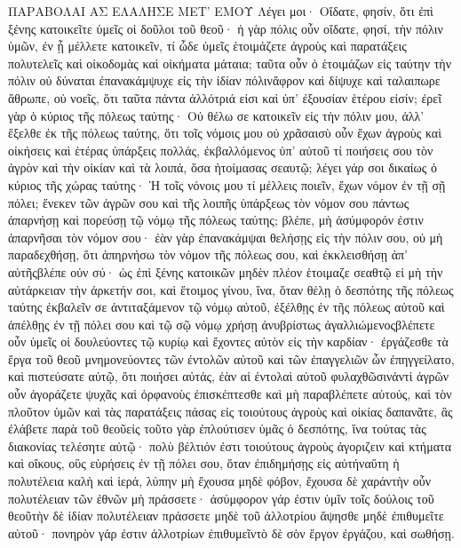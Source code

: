 ΠΑΡΑΒΟΛΑΙ ΑΣ ΕΛΑΛΗΣΕ ΜΕΤ’ ΕΜΟΥ
Λέγει μοι· Οἴδατε, φησίν, ὅτι ἐπὶ ξένης κατοικεῖτε ὑμεῖς οἱ δοῦλοι τοῦ θεοῦ· ἡ γὰρ πόλις οὖν οἴδατε, φησί, τὴν πόλιν ὑμῶν, ἐν ᾗ μέλλετε κατοικεῖν, τί ὧδε ὑμεῖς ἑτοιμάζετε ἀγροὺς καὶ παρατάξεις πολυτελεῖς καὶ οἰκοδομὰς καὶ οἰκήματα μάταια; ταῦτα οὖν ὁ ἑτοιμάζων εἰς ταύτην τὴν πόλιν οὐ δύναται ἐπανακάμψυχε εἰς τὴν ἰδίαν πόλινἄφρον καὶ δίψυχε καὶ ταλαιπωρε ἄθρωπε, οὐ νοεῖς, ὅτι ταῦτα πάντα ἀλλότριά εἰσι καὶ ὑπ’ ἐξουσίαν ἑτέρου εἰσίν; ἐρεῖ γὰρ ὁ κύριος τῆς πόλεως ταύτης· Οὐ θέλω σε κατοικεῖν εἰς τὴν πόλιν μου, ἀλλ’ ἔξελθε ἐκ τῆς πόλεως ταύτης, ὅτι τοῖς νόμοις μου οὐ χρᾶσαισὺ οὖν ἔχων ἀγροὺς καὶ οἰκήσεις καὶ ἑτέρας ὑπάρξεις πολλάς, ἐκβαλλόμενος ὑπ’ αὐτοῦ τί ποιήσεις σου τὸν ἀγρὸν καὶ τὴν οἰκίαν καὶ τὰ λοιπά, ὅσα ἡτοίμασας σεαυτῷ; λέγει γάρ σοι δικαίως ὁ κύριος τῆς χώρας ταύτης· Ἡ τοῖς νόνοις μου τί μέλλεις ποιεῖν, ἔχων νόμον ἐν τῇ σῇ πόλει; ἕνεκεν τῶν ἀγρῶν σου καὶ τῆς λοιπῆς ὑπάρξεως τὸν νόμον σου πάντως ἀπαρνήσῃ καὶ πορεύσῃ τῷ νόμῳ τῆς πόλεως ταύτης; βλέπε, μὴ ἀσύμφορόν ἐστιν ἀπαρνῆσαι τὸν νόμον σου· ἐὰν γὰρ ἐπανακάμψαι θελήσῃς εἰς τὴν πόλιν σου, οὐ μὴ παραδεχθήσῃ, ὅτι ἀπηρνήσω τὸν νόμον τῆς πόλεως σου, καὶ ἐκκλεισθήσῃ ἀπ’ αὐτῆςβλέπε οὐν σύ· ὡς ἐπὶ ξένης κατοικῶν μηδὲν πλέον ἑτοιμαζε σεαθτῷ εἰ μὴ τὴν αὐτάρκειαν τὴν ἀρκετήν σοι, καὶ ἔτοιμος γίνου, ἵνα, ὅταν θέλῃ ὁ δεσπότης τῆς πόλεως ταύτης ἐκβαλεῖν σε ἀντιταξάμενον τῷ νόμῳ αὐτοῦ, ἐξέλθῃς ἐν τῆς πόλεως αὐτοῦ καὶ ἀπέλθῃς ἐν τῇ πόλει σου καὶ τῷ σῷ νόμῳ χρήσῃ ἀνυβρίστως ἀγαλλιώμενοςβλέπετε οὖν ὑμεῖς οἱ δουλεύοντες τῷ κυρίῳ καὶ ἔχοντες αὐτὸν εἰς τὴν καρδίαν· ἐργάζεσθε τὰ ἔργα τοῦ θεοῦ μνημονεύοντες τῶν ἐντολῶν αὐτοῦ καὶ τῶν ἐπαγγελιῶν ὧν ἐπηγγείλατο, καὶ πιστεύσατε αὐτῷ, ὅτι ποιήσει αὐτάς, ἐὰν αἱ ἐντολαὶ αὐτοῦ φυλαχθῶσινἀντὶ ἀγρῶν οὖν ἀγοράζετε ψυχᾶς καὶ ὀρφανοὺς ἐπισκέπτεσθε καὶ μὴ παραβλέπετε αὐτούς, καὶ τὸν πλοῦτον ὑμῶν καὶ τὰς παρατάξεις πάσας εἰς τοιούτους ἀγροὺς καὶ οἰκίας δαπανᾶτε, ἃς ἐλάβετε παρὰ τοῦ θεοῦεἰς τοῦτο γὰρ ἐπλούτισεν ὑμᾶς ὁ δεσπότης, ἵνα τούτας τὰς διακονίας τελέσητε αὐτῷ· πολὺ βέλτιόν ἐστι τοιούτους ἀγροὺς ἀγοριζειν καὶ κτήματα καὶ οἴκους, οὓς εὑρήσεις ἐν τῇ πόλει σου, ὅταν ἐπιδημήσῃς εἰς αὐτήναὕτη ἡ πολυτέλεια καλὴ καὶ ἱερά, λύπην μὴ ἔχουσα μηδὲ φόβον, ἔχουσα δὲ χαράντὴν οὖν πολυτέλειαν τῶν ἐθνῶν μὴ πράσσετε· ἀσύμφορον γάρ ἐστιν ὐμῖν τοῖς δούλοις τοῦ θεοῦτὴν δὲ ἰδίαν πολυτέλειαν πράσσετε μηδὲ τοῦ ἀλλοτρίου ἅψησθε μηδὲ ἐπιθυμεῖτε αὐτοῦ· πονηρὸν γάρ ἐστιν ἀλλοτρίων ἐπιθυμεῖντὸ δὲ σὸν ἔργον ἐργάζου, καὶ σωθήσῃ.

